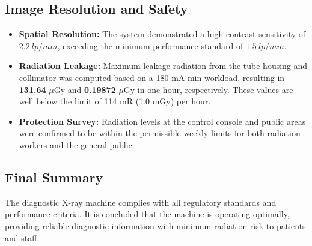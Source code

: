 \subsection{Image Resolution and Safety}
\begin{itemize}
    \item \textbf{Spatial Resolution:} The system demonstrated a high-contrast sensitivity of $2.2~lp/mm$, exceeding the minimum performance standard of $1.5~lp/mm$. 
    \item \textbf{Radiation Leakage:} Maximum leakage radiation from the tube housing and collimator was computed based on a 180 mA-min workload, resulting in \textbf{131.64} $\mu$Gy and \textbf{0.19872} $\mu$Gy in one hour, respectively. These values are well below the limit of 114 mR (1.0 mGy) per hour.
    \item \textbf{Protection Survey:} Radiation levels at the control console and public areas were confirmed to be within the permissible weekly limits for both radiation workers and the general public.
\end{itemize}

\subsection{Final Summary}
The diagnostic X-ray machine complies with all regulatory standards and performance criteria. It is concluded that the machine is operating optimally, providing reliable diagnostic information with minimum radiation risk to patients and staff.
